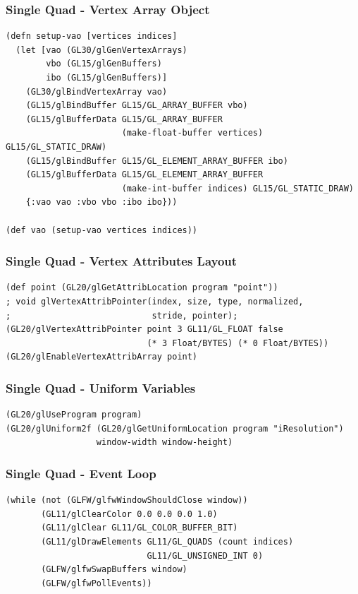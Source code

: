\documentclass[aspectratio=169,11pt,xcolor=dvipsnames]{beamer}
\begin{document}
\begin{frame}[fragile]
  \frametitle{Single Quad {-} Vertex Array Object}
  \begin{verbatim}
(defn setup-vao [vertices indices]
  (let [vao (GL30/glGenVertexArrays)
        vbo (GL15/glGenBuffers)
        ibo (GL15/glGenBuffers)]
    (GL30/glBindVertexArray vao)
    (GL15/glBindBuffer GL15/GL_ARRAY_BUFFER vbo)
    (GL15/glBufferData GL15/GL_ARRAY_BUFFER
                       (make-float-buffer vertices) GL15/GL_STATIC_DRAW)
    (GL15/glBindBuffer GL15/GL_ELEMENT_ARRAY_BUFFER ibo)
    (GL15/glBufferData GL15/GL_ELEMENT_ARRAY_BUFFER
                       (make-int-buffer indices) GL15/GL_STATIC_DRAW)
    {:vao vao :vbo vbo :ibo ibo}))

(def vao (setup-vao vertices indices))
  \end{verbatim}
\end{frame}

\begin{frame}[fragile]
  \frametitle{Single Quad {-} Vertex Attributes Layout}
  \begin{verbatim}
(def point (GL20/glGetAttribLocation program "point"))
; void glVertexAttribPointer(index, size, type, normalized,
;                            stride, pointer);
(GL20/glVertexAttribPointer point 3 GL11/GL_FLOAT false
                            (* 3 Float/BYTES) (* 0 Float/BYTES))
(GL20/glEnableVertexAttribArray point)
  \end{verbatim}
\end{frame}

\begin{frame}[fragile]
  \frametitle{Single Quad {-} Uniform Variables}
  \begin{verbatim}
(GL20/glUseProgram program)
(GL20/glUniform2f (GL20/glGetUniformLocation program "iResolution")
                  window-width window-height)
  \end{verbatim}
\end{frame}

\begin{frame}[fragile]
  \frametitle{Single Quad {-} Event Loop}
  \begin{verbatim}
(while (not (GLFW/glfwWindowShouldClose window))
       (GL11/glClearColor 0.0 0.0 0.0 1.0)
       (GL11/glClear GL11/GL_COLOR_BUFFER_BIT)
       (GL11/glDrawElements GL11/GL_QUADS (count indices)
                            GL11/GL_UNSIGNED_INT 0)
       (GLFW/glfwSwapBuffers window)
       (GLFW/glfwPollEvents))
  \end{verbatim}
\end{frame}
\end{document}
